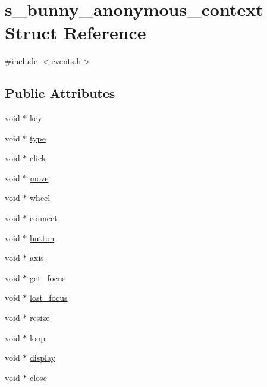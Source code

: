\hypertarget{structs__bunny__anonymous__context}{\section{s\-\_\-bunny\-\_\-anonymous\-\_\-context Struct Reference}
\label{structs__bunny__anonymous__context}
}


{\ttfamily \#include $<$events.\-h$>$}

\subsection*{Public Attributes}
\begin{DoxyCompactItemize}
\item 
void $\ast$ \hyperlink{structs__bunny__anonymous__context_ac1775eb9c573160f0d103e707ac37bbd}{key}
\item 
void $\ast$ \hyperlink{structs__bunny__anonymous__context_a96080593e8d4538622ae7162c9408d28}{type}
\item 
void $\ast$ \hyperlink{structs__bunny__anonymous__context_ae4984808492a19cd87311089e8432696}{click}
\item 
void $\ast$ \hyperlink{structs__bunny__anonymous__context_a4cbf73f6961d4da969a3781e78045246}{move}
\item 
void $\ast$ \hyperlink{structs__bunny__anonymous__context_a100036ec71cddf932a63cf5739875c96}{wheel}
\item 
void $\ast$ \hyperlink{structs__bunny__anonymous__context_a6929f895e02b19a624071c6328a12f00}{connect}
\item 
void $\ast$ \hyperlink{structs__bunny__anonymous__context_a58483eb52dcd4486be2e2b307259db23}{button}
\item 
void $\ast$ \hyperlink{structs__bunny__anonymous__context_a61fda382eeeb712785f94a26e11a5056}{axis}
\item 
void $\ast$ \hyperlink{structs__bunny__anonymous__context_ab54ae5052dab4f4f794a1a03d7f9d3e5}{get\-\_\-focus}
\item 
void $\ast$ \hyperlink{structs__bunny__anonymous__context_ab197fa495e70b0f61fe396c7386a3350}{lost\-\_\-focus}
\item 
void $\ast$ \hyperlink{structs__bunny__anonymous__context_a1b47f26baaefe3faf8e40cc0dd44892b}{resize}
\item 
void $\ast$ \hyperlink{structs__bunny__anonymous__context_a47794faa6e79c9c196cafc8dd3ea7c96}{loop}
\item 
void $\ast$ \hyperlink{structs__bunny__anonymous__context_aa1832019676dc0f6909c5fc629b5da4f}{display}
\item 
void $\ast$ \hyperlink{structs__bunny__anonymous__context_aefd9ae58571b39af5a26e76ae05bce5d}{close}
\end{DoxyCompactItemize}


